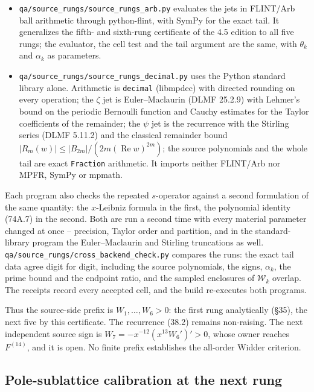 \documentclass[
  11pt,
]{book}
\providecommand{\tightlist}{%
  \setlength{\itemsep}{0pt}\setlength{\parskip}{0pt}}
\begin{document}
\begin{itemize}
\tightlist
\item
  \texttt{qa/source\_rungs/source\_rungs\_arb.py} evaluates the jets in
  FLINT/Arb ball arithmetic through python-flint, with SymPy for the
  exact tail. It generalizes the fifth- and sixth-rung certificate of
  the 4.5 edition to all five rungs; the evaluator, the cell test and
  the tail argument are the same, with \(\theta_k\) and \(\alpha_k\) as
  parameters.
\item
  \texttt{qa/source\_rungs/source\_rungs\_decimal.py} uses the Python
  standard library alone. Arithmetic is \texttt{decimal} (libmpdec) with
  directed rounding on every operation; the \(\zeta\) jet is
  Euler--Maclaurin (DLMF 25.2.9) with Lehmer's bound on the periodic
  Bernoulli function and Cauchy estimates for the Taylor coefficients of
  the remainder; the \(\psi\) jet is the recurrence with the Stirling
  series (DLMF 5.11.2) and the classical remainder bound
  \(|R_m(w)|\le|B_{2m}|/(2m(\operatorname{Re}w)^{2m})\); the source
  polynomials and the whole tail are exact \texttt{Fraction} arithmetic.
  It imports neither FLINT/Arb nor MPFR, SymPy or mpmath.
\end{itemize}

Each program also checks the repeated \(s\)-operator against a second
formulation of the same quantity: the \(x\)-Leibniz formula in the
first, the polynomial identity (74A.7) in the second. Both are run a
second time with every material parameter changed at once -- precision,
Taylor order and partition, and in the standard-library program the
Euler--Maclaurin and Stirling truncations as well.
\texttt{qa/source\_rungs/cross\_backend\_check.py} compares the runs:
the exact tail data agree digit for digit, including the source
polynomials, the signs, \(\alpha_k\), the prime bound and the endpoint
ratio, and the sampled enclosures of \(\mathcal W_k\) overlap. The
receipts record every accepted cell, and the build re-executes both
programs.

Thus the source-side prefix is \(W_1,\ldots,W_6>0\): the first rung
analytically (§35), the next five by this certificate. The recurrence
(38.2) remains non-raising. The next independent source sign is
\(W_7=-x^{-12}(x^{13}W_6')'>0\), whose owner reaches \(F^{(14)}\), and
it is open. No finite prefix establishes the all-order Widder criterion.

\subsection{Pole-sublattice calibration at the next
rung}\label{pole-sublattice-calibration-at-the-next-rung}
\end{document}
